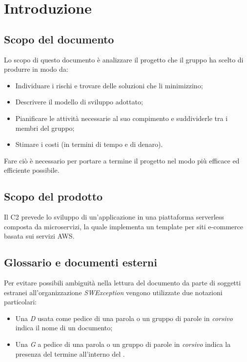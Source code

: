 \section{Introduzione} \label{_introduzione}

\subsection{Scopo del documento}
Lo scopo di questo documento è analizzare il progetto che il gruppo ha scelto di produrre in modo da:
\begin{itemize}
    \item Individuare i rischi e trovare delle soluzioni che li minimizzino;
    \item Descrivere il modello di sviluppo adottato;
    \item Pianificare le attività necessarie al suo compimento e suddividerle tra i membri del gruppo;
    \item Stimare i costi (in termini di tempo e di denaro).
\end{itemize}
Fare ciò è necessario per portare a termine il progetto nel modo più efficace ed efficiente possibile.

\subsection{Scopo del prodotto}
Il  C2 prevede lo sviluppo di un'applicazione in una piattaforma serverless composta da microservizi, la quale implementa un template per siti e-commerce basata sui servizi AWS.

\subsection{Glossario  e documenti esterni}
Per evitare possibili ambiguità nella lettura del documento da parte di soggetti estranei all'organizzazione \textit{SWException} vengono utilizzate due notazioni particolari:
\begin{itemize}
    \item Una \textit{D} usata come pedice di una parola o un gruppo di parole in \textit{corsivo} indica il nome di un documento;
    \item Una \textit{G} a pedice di una parola o un gruppo di parole in \textit{corsivo} indica la presenza del termine all'interno del .
\end{itemize}

